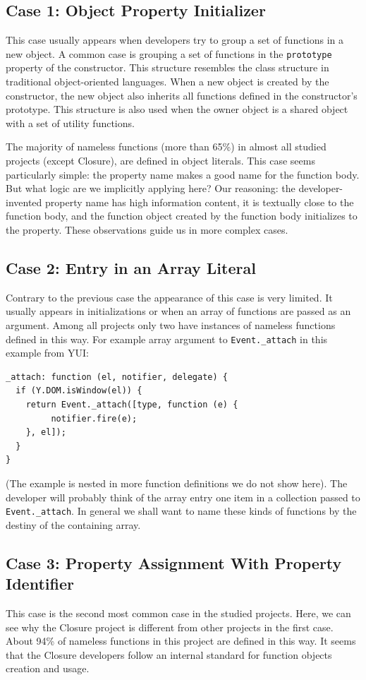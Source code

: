 \documentclass[10pt, preprint]{sigplanconf}
\begin{document}
\subsection{Case 1: Object Property Initializer}
 This case usually appears when developers try to group a set of functions in a new object. A common case is grouping a set of functions in the {\small\texttt{prototype}} property of the constructor. This structure resembles the class structure in traditional object-oriented languages. When a new object is created by the constructor, the new object also inherits all functions defined in the constructor's prototype. This structure is also used  when the owner object is a shared object with a set of utility functions.
 
 The majority of nameless functions (more than 65\%) in almost all studied projects (except Closure), are defined in object literals. This case seems particularly simple: the property name makes a good name for the function body. But what logic are we implicitly applying here? Our reasoning: the developer-invented property name has high information content, it is textually close to the function body, and the function object created by the function body initializes to the property. These observations guide us in more complex cases.
 
\subsection{Case 2: Entry in an Array Literal}
\label{sec:arrayLiteral}
Contrary to the previous case the appearance of this case is very limited. It usually appears in initializations or when an array of functions are passed as an argument. Among all projects only two have instances of nameless functions defined in this way. For example array argument to \verb|Event._attach| in this example from YUI:
\begin{verbatim}
_attach: function (el, notifier, delegate) {
  if (Y.DOM.isWindow(el)) {
    return Event._attach([type, function (e) {
         notifier.fire(e);
    }, el]);
  }
}
\end{verbatim}
(The example is nested in more function definitions we do not show here). The developer will probably think of the array entry one item in a collection passed to \verb|Event._attach|. In general we shall want to name these kinds of functions by the destiny of the containing array.

\subsection{Case 3: Property Assignment With Property Identifier}
\label{sec:propid}
This case is the second most common case in the studied projects. Here, we can see why the Closure project is different from other projects in the first case. About 94\% of nameless functions in this project are defined in this way. It seems that the Closure developers follow an internal standard for function objects creation and usage.  
\end{document}
